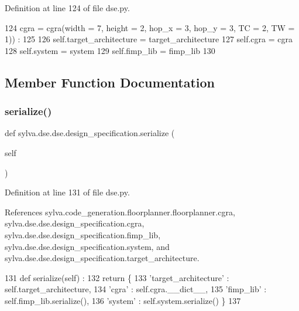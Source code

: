 Definition at line 124 of file dse.\+py.


\begin{DoxyCode}
124     cgra = cgra(width = 7, height = 2, hop\_x = 3, hop\_y = 3, TC = 2, TW = 1)) :
125 
126     self.target\_architecture = target\_architecture
127     self.cgra = cgra
128     self.system = system
129     self.fimp\_lib = fimp\_lib
130 
\end{DoxyCode}


\subsection{Member Function Documentation}
\mbox{\label{classsylva_1_1dse_1_1dse_1_1design__specification_add24965827d00b11032bd22aa2606169}} 
\subsubsection{\texorpdfstring{serialize()}{serialize()}}
{\footnotesize\ttfamily def sylva.\+dse.\+dse.\+design\+\_\+specification.\+serialize (\begin{DoxyParamCaption}\item[{}]{self }\end{DoxyParamCaption})}



Definition at line 131 of file dse.\+py.



References sylva.\+code\+\_\+generation.\+floorplanner.\+floorplanner.\+cgra, sylva.\+dse.\+dse.\+design\+\_\+specification.\+cgra, sylva.\+dse.\+dse.\+design\+\_\+specification.\+fimp\+\_\+lib, sylva.\+dse.\+dse.\+design\+\_\+specification.\+system, and sylva.\+dse.\+dse.\+design\+\_\+specification.\+target\+\_\+architecture.


\begin{DoxyCode}
131   \textcolor{keyword}{def }serialize(self) :
132     \textcolor{keywordflow}{return} \{
133       \textcolor{stringliteral}{'target\_architecture'} : self.target\_architecture,
134       \textcolor{stringliteral}{'cgra'} : self.cgra.\_\_dict\_\_,
135       \textcolor{stringliteral}{'fimp\_lib'} : self.fimp\_lib.serialize(),
136       \textcolor{stringliteral}{'system'} : self.system.serialize() \}
137 
\end{DoxyCode}


